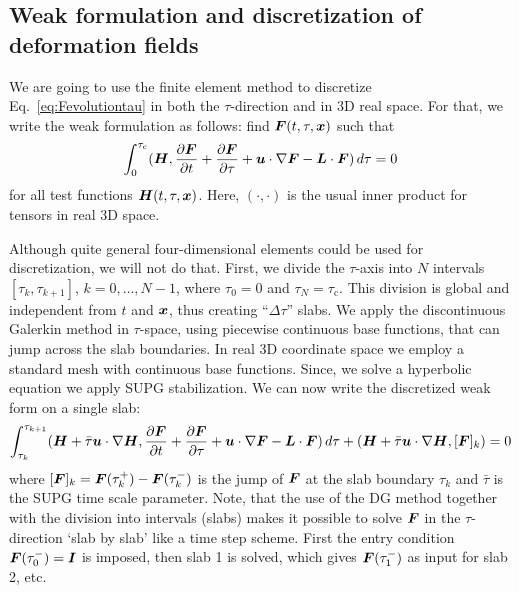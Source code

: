 \subsection{Weak formulation and discretization of deformation fields}

We are going to use the finite element method to discretize Eq.~\eqref{eq:Fevolutiontau} in both the $\tau$-direction and in 3D real space. For that, we write the weak formulation as follows: find $\boldsymbol{F}(t,\tau,\boldsymbol{x})$ such that
\begin{equation}
    \int_0^{\tau_\text{c}} ( \boldsymbol{H},\dfrac{\partial \boldsymbol{F}}{\partial t}+
           \dfrac{\partial \boldsymbol{F}}{\partial \tau}+\boldsymbol{u}\cdot\nabla\boldsymbol{F}-\boldsymbol{L}\cdot \boldsymbol{F})\,d\tau=0 
\end{equation}
for all test functions $\boldsymbol{H}(t,\tau,\boldsymbol{x})$. Here, $(\cdot,\cdot)$ is the usual inner product for tensors in real 3D space.

Although quite general four-dimensional elements could be used for discretization, we will not do that. First, we divide the $\tau$-axis into $N$ intervals
 $[\tau_k,\tau_{k+1}]$, $k=0,\dots,N-1$, where $\tau_0=0$ and $\tau_{N}=\tau_\text{c}$. This division is global and independent from $t$ and $\boldsymbol{x}$, thus creating ``$\Delta\tau$'' slabs. We apply the discontinuous Galerkin method 
 in $\tau$-space, using piecewise continuous base functions,
  that can jump across the slab boundaries. In real 3D coordinate space we
  employ a standard mesh with continuous base functions. Since, we solve a hyperbolic equation we apply SUPG stabilization. We can now write the discretized weak form on a single slab:
  \begin{equation}
    \int_{\tau_k}^{\tau_{k+1}} (\boldsymbol{H}+\bar\tau\boldsymbol{u}\cdot\nabla\boldsymbol{H},\dfrac{\partial \boldsymbol{F}}{\partial t}+
           \dfrac{\partial \boldsymbol{F}}{\partial \tau}+\boldsymbol{u}\cdot\nabla\boldsymbol{F}-\boldsymbol{L}\cdot \boldsymbol{F})\,d\tau
            +(\boldsymbol{H}+\bar\tau\boldsymbol{u}\cdot\nabla\boldsymbol{H},[\boldsymbol{F}]_k)=0 \label{eq:weakF}
\end{equation}
where $[\boldsymbol{F}]_k=\boldsymbol{F}(\tau^+_k)-\boldsymbol{F}(\tau^-_{k})$ is the jump of $\boldsymbol{F}$ at the slab boundary $\tau_k$ and $\bar\tau$ is the SUPG time scale parameter. Note, that the use of the DG method together with the division into intervals (slabs) makes it possible to solve $\boldsymbol{F}$ in the $\tau$-direction `slab by slab' like a time step scheme. First the entry condition $\boldsymbol{F}(\tau^-_0)=\boldsymbol{I}$ is imposed, then slab 1 is solved, which gives $\boldsymbol{F}(\tau^-_1)$ as input for slab 2, etc.

